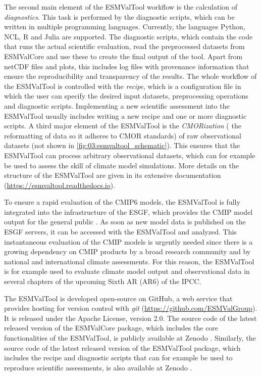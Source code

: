 The second main element of the \ac{ESMValTool} workflow is the calculation of
\emph{diagnostics}. This task is performed by the diagnostic scripts, which can
be written in multiple programming languages. Currently, the languages Python,
NCL, R and Julia are supported. The diagnostic scripts, which contain the code
that runs the actual scientific evaluation, read the preprocessed datasets from
\ac{ESMValCore} and use these to create the final output of the tool. Apart
from \ac{netCDF} files and plots, this includes log files with provenance
information that ensure the reproducibility and transparency of the results.
The whole workflow of the \ac{ESMValTool} is controlled with the \emph{recipe},
which is a configuration file in which the user can specify the desired input
datasets, preprocessing operations and diagnostic scripts. Implementing a new
scientific assessment into the \ac{ESMValTool} usually includes writing a new
recipe and one or more diagnostic scripts. A third major element of the
\ac{ESMValTool} is the \emph{\ac{CMOR}ization} (\ie{} the reformatting of data
so it adheres to \ac{CMOR} standards) of raw observational datasets (not shown
in \cref{fig:03:esmvaltool_schematic}). This ensures that the \ac{ESMValTool}
can process arbitrary observational datasets, which can for example be used to
assess the skill of climate model simulations. More details on the structure of
the \ac{ESMValTool} are given in its extensive documentation
(\url{https://esmvaltool.readthedocs.io}).

To ensure a rapid evaluation of the \acs{CMIP}6 models, the \ac{ESMValTool} is
fully integrated into the infrastructure of the \ac{ESGF}, which provides the
\ac{CMIP} model output for the general public \autocite{Eyring2016b}. As soon
as new model data is published on the \ac{ESGF} servers, it can be accessed
with the \ac{ESMValTool} and analyzed. This instantaneous evaluation of the
\ac{CMIP} models is urgently needed since there is a growing dependency on
\ac{CMIP} products by a broad research community and by national and
international climate assessments. For this reason, the \ac{ESMValTool} is for
example used to evaluate climate model output and observational data in several
chapters of the upcoming Sixth \acl{AR} (\acs{AR}6) of the \ac{IPCC}.

The \ac{ESMValTool} is developed open-source on GitHub, a web service that
provides hosting for version control with \emph{git}
(\url{https://github.com/ESMValGroup}). It is released under the Apache
License, version 2.0. The source code of the latest released version of the
\ac{ESMValCore} package, which includes the core functionalities of the
\ac{ESMValTool}, is publicly available at Zenodo \autocite{Andela2020a}.
Similarly, the source code of the latest released version of the
\ac{ESMValTool} package, which includes the recipe and diagnostic scripts that
can for example be used to reproduce scientific assessments, is also available
at Zenodo \autocite{Andela2020}.


